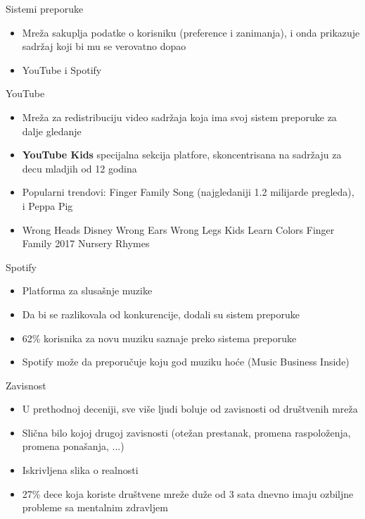 \documentclass[14pt, aspectratio=169]{beamer}
\begin{document}
\begin{frame}{Sistemi preporuke}
    \begin{itemize}
        \item Mreža sakuplja podatke o korisniku (preference i zanimanja), i onda prikazuje sadržaj koji bi mu se verovatno dopao
    \end{itemize}
    \begin{itemize}
        \item YouTube i Spotify
    \end{itemize}
\end{frame}

\begin{frame}{YouTube}
    \begin{itemize}
        \item Mreža za redistribuciju video sadržaja koja ima svoj sistem preporuke za dalje gledanje
    \end{itemize}
    \begin{itemize}
        \item \textbf{YouTube Kids} specijalna sekcija platfore, skoncentrisana na sadržaju za decu mladjih od 12 godina
        \item Popularni trendovi: Finger Family Song (najgledaniji 1.2 milijarde pregleda), i Peppa Pig
        \item Wrong Heads Disney Wrong
        Ears Wrong Legs Kids Learn Colors Finger Family 2017 Nursery Rhymes
    \end{itemize}
\end{frame}

\begin{frame}{Spotify}
    \begin{itemize}
        \item Platforma za slusašnje muzike
        \item Da bi se razlikovala od konkurencije, dodali su sistem preporuke
        \item 62\% korisnika za novu muziku saznaje preko sistema preporuke
        \item Spotify može da preporučuje koju god muziku hoće (Music Business Inside)
    \end{itemize}
\end{frame}


\begin{frame}{Zavisnost}
    \begin{itemize}
        \item U prethodnoj deceniji, sve više ljudi boluje od zavisnosti od društvenih mreža
        \item Slična bilo kojoj drugoj zavisnosti (otežan prestanak, promena raspoloženja, promena ponašanja, ...)
        \item Iskrivljena slika o realnosti
        \item 27\% dece koja koriste društvene mreže duže od 3 sata dnevno imaju ozbiljne probleme sa mentalnim zdravljem
    \end{itemize}
\end{frame}
\end{document}
